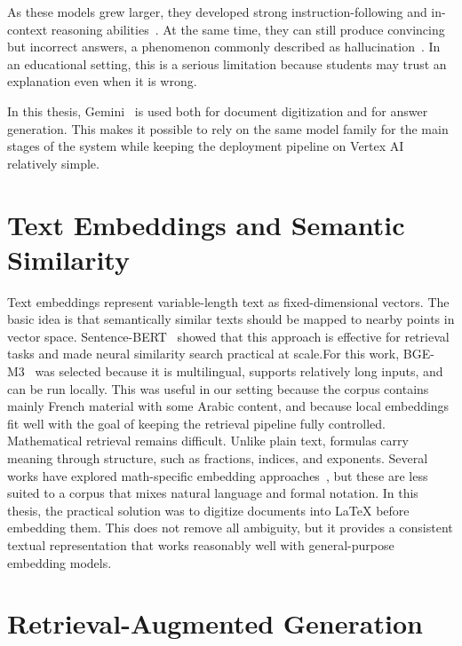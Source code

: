 As these models grew larger, they developed strong instruction-following and
in-context reasoning abilities~\cite{brown2020gpt3}. At the same time, they
can still produce convincing but incorrect answers, a phenomenon commonly
described as hallucination~\cite{ji2023hallucination_survey}. In an
educational setting, this is a serious limitation because students may trust
an explanation even when it is wrong.

In this thesis, Gemini~\cite{team2023gemini} is used both for document
digitization and for answer generation. This makes it possible to rely on
the same model family for the main stages of the system while keeping the
deployment pipeline on Vertex AI relatively simple.

\section{Text Embeddings and Semantic Similarity}
\label{sec:embeddings-background}

Text embeddings represent variable-length text as fixed-dimensional vectors.
The basic idea is that semantically similar texts should be mapped to nearby
points in vector space. Sentence-BERT~\cite{reimers2019sentence_bert}
showed that this approach is effective for retrieval tasks and made neural
similarity search practical at scale.For this work, BGE-M3~\cite{chen2024bge_m3} 
was selected because it is multilingual, supports relatively long inputs, and can be run locally. This
was useful in our setting because the corpus contains mainly French material
with some Arabic content, and because local embeddings fit well with the
goal of keeping the retrieval pipeline fully controlled.
Mathematical retrieval remains difficult. Unlike plain text, formulas carry
meaning through structure, such as fractions, indices, and exponents.
Several works have explored math-specific embedding approaches~\cite{mansouri2019tangent,pfahler2020math_embeddings},
but these are less suited to a corpus that mixes natural language and formal
notation. In this thesis, the practical solution was to digitize documents
into \LaTeX{} before embedding them. This does not remove all ambiguity, but
it provides a consistent textual representation that works reasonably well
with general-purpose embedding models.

\section{Retrieval-Augmented Generation}
\label{sec:rag-background}

